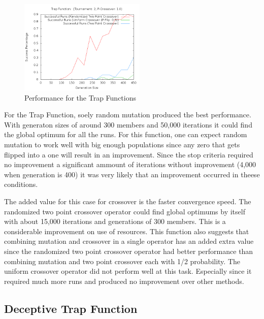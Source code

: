 \documentclass[10pt]{article}
\begin{document}
\begin{figure}[h!]
    \includegraphics[height=170px]{img/TrapFunctionCrossoverGens.png}
    \caption[Performance for the Trap Functions]{Performance for the Trap Functions}
\end{figure}

For the Trap Function, soely random mutation produced the best performance. With generaton sizes of around 300 members and 50,000 iterations it could find the global optimum for all the runs. For this function, one can expect random mutation to work well with big enough populations since any zero that gets flipped into a one will result in an improvement. Since the stop criteria required no improvement a significant ammount of iterations without improvement (4,000 when generation is 400) it was very likely that an improvement occurred in theese conditions.

The added value for this case for crossover is the faster convergence speed. The randomized two point crossover operator could find global optimums by itself with about 15,000 iterations and generations of 300 members. This is a considerable improvement on use of resources. This function also suggests that combining mutation and crossover in a single operator has an added extra value since the randomized two point crossover operator had better performance than combining mutation and two point crossover each with 1/2 probability. The uniform crossover operator did not perform well at this task. Especially since it required much more runs and produced no improvement over other methods.
\pagebreak
\subsection{Deceptive Trap Function}
\end{document}
